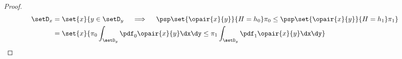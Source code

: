 \begin{theorem}
\end{theorem}
\begin{proof}
\begin{align*}
  \setD_x 
    &= \set{x}
         {y\in\setD_y 
          \quad\implies\quad 
          \psp\set{\opair{x}{y}}{H=h_0}\pi_0\le\psp\set{\opair{x}{y}}{H=h_1}\pi_1
         }
  \\&= \set{x}
         {\pi_0\int_{\setD_y} \pdf_0\opair{x}{y}\dx\dy
          \le
          \pi_1\int_{\setD_y} \pdf_1\opair{x}{y} \dx\dy
         }
\end{align*}
\end{proof}

